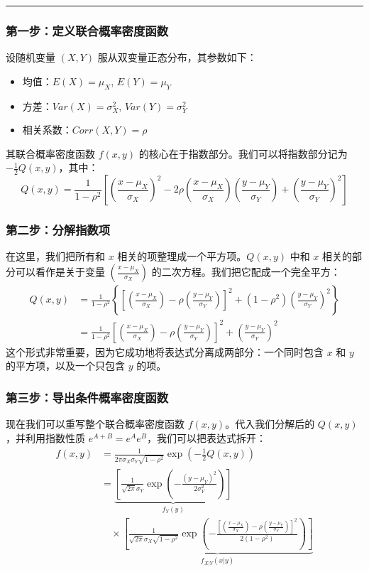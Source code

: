 \documentclass[UTF8]{ctexart}
\begin{document}
\hrule
\vspace{1em}

\subsubsection*{第一步：定义联合概率密度函数 }

设随机变量 $(X, Y)$ 服从双变量正态分布，其参数如下：
\begin{itemize}
    \item 均值：$E(X) = \mu_X$, $E(Y) = \mu_Y$
    \item 方差：$Var(X) = \sigma_X^2$, $Var(Y) = \sigma_Y^2$
    \item 相关系数：$Corr(X, Y) = \rho$
\end{itemize}

其联合概率密度函数 $f(x, y)$ 的核心在于指数部分。我们可以将指数部分记为 $-\frac{1}{2}Q(x,y)$，其中：
$$
Q(x,y) = \frac{1}{1-\rho^2} \left[ \left(\frac{x-\mu_X}{\sigma_X}\right)^2 - 2\rho\left(\frac{x-\mu_X}{\sigma_X}\right)\left(\frac{y-\mu_Y}{\sigma_Y}\right) + \left(\frac{y-\mu_Y}{\sigma_Y}\right)^2 \right]
$$

\subsubsection*{第二步：分解指数项}

在这里，我们把所有和 $x$ 相关的项整理成一个平方项。$Q(x, y)$ 中和 $x$ 相关的部分可以看作是关于变量 $(\frac{x-\mu_X}{\sigma_X})$ 的二次方程。我们把它配成一个完全平方：
\begin{align*}
Q(x,y) &= \frac{1}{1-\rho^2} \left\{ \left[ \left(\frac{x-\mu_X}{\sigma_X}\right) - \rho\left(\frac{y-\mu_Y}{\sigma_Y}\right) \right]^2 + (1-\rho^2)\left(\frac{y-\mu_Y}{\sigma_Y}\right)^2 \right\} \\
&= \frac{1}{1-\rho^2} \left[ \left(\frac{x-\mu_X}{\sigma_X}\right) - \rho\left(\frac{y-\mu_Y}{\sigma_Y}\right) \right]^2 + \left(\frac{y-\mu_Y}{\sigma_Y}\right)^2
\end{align*}
这个形式非常重要，因为它成功地将表达式分离成两部分：一个同时包含 $x$ 和 $y$ 的平方项，以及一个只包含 $y$ 的项。

\subsubsection*{第三步：导出条件概率密度函数}

现在我们可以重写整个联合概率密度函数 $f(x,y)$。代入我们分解后的 $Q(x,y)$，并利用指数性质 $e^{A+B} = e^A e^B$，我们可以把表达式拆开：
\begin{align*}
f(x,y) &= \frac{1}{2\pi\sigma_X\sigma_Y\sqrt{1-\rho^2}} \exp\left(-\frac{1}{2}Q(x,y)\right) \\
&= \underbrace{\left[ \frac{1}{\sqrt{2\pi}\sigma_Y} \exp\left( -\frac{(y-\mu_Y)^2}{2\sigma_Y^2} \right) \right]}_{f_Y(y)} \\
& \quad \times \underbrace{\left[ \frac{1}{\sqrt{2\pi}\sigma_X\sqrt{1-\rho^2}} \exp\left( -\frac{\left[ \left(\frac{x-\mu_X}{\sigma_X}\right) - \rho\left(\frac{y-\mu_Y}{\sigma_Y}\right) \right]^2}{2(1-\rho^2)} \right) \right]}_{f_{X|Y}(x|y)}
\end{align*}
\end{document}
